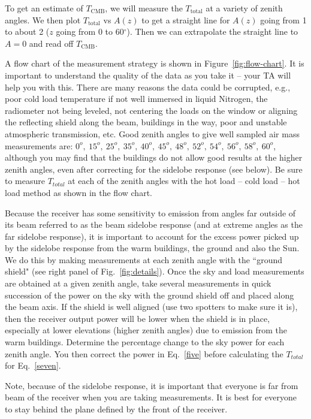 \begin{framed}
To get an estimate of $T_\textrm{CMB}$, we will measure the $T_\textrm{total}$ at a variety of zenith angles. We then plot $T_\textrm{total}$ vs $A(z)$ to get a straight line for $A(z)$ going from 1 to about 2 ($z$ going from 0 to 60$^\circ$). Then we can extrapolate the straight line to $A=0$ and read off $T_\textrm{CMB}$.
\end{framed}

A flow chart of the measurement strategy is shown in Figure~\ref{fig:flow-chart}. It is important to understand the quality of the data as you take it -- your TA will help you with this. There are many reasons the data could be corrupted, e.g., poor cold load temperature if not well immersed in liquid Nitrogen, the radiometer not being leveled, not centering the loads on the window or aligning the reflecting shield along the beam, buildings in the way, poor  and unstable atmospheric transmission, etc.
Good zenith angles to give well sampled air mass measurements are: $0^o,~15^o,~25^o,~35^o,~40^o,~45^o,~48^o,~52^o,~54^o,~56^o,~58^o,~60^o$, although you may find that the buildings do not allow good results at the higher zenith angles, even after correcting for the sidelobe response (see below).   Be sure to 
measure $T_{total}$ at each of the zenith angles with the hot load  -- cold load -- hot load method as shown in the flow chart.  

Because the receiver has some sensitivity to emission from angles far outside of its beam referred to as the beam sidelobe response (and at extreme angles as the far sidelobe response),  it is important to account for the excess power picked up by the sidelobe response from the warm buildings, the ground and also the Sun. We do this by making measurements at each zenith angle with the   ``ground shield" (see right panel of Fig.~\ref{fig:details}).  Once the sky and load measurements are obtained at a given zenith angle, take several measurements in quick succession of the power on the sky with the ground shield off and placed along the beam axis.  If the shield is well aligned (use two spotters to make sure it is), then the receiver output power will be lower when the shield is in place, especially at lower elevations (higher zenith angles) due to emission from the warm buildings.  Determine the percentage change to the sky power for each zenith angle. You then correct the power in Eq.~\ref{five} before calculating the $T_{total}$ for Eq.~\ref{seven}.

Note, because of the sidelobe response, it is important that everyone is far from beam of the receiver when you are taking measurements. It is best for everyone to stay behind the plane defined by the front of the receiver. 

